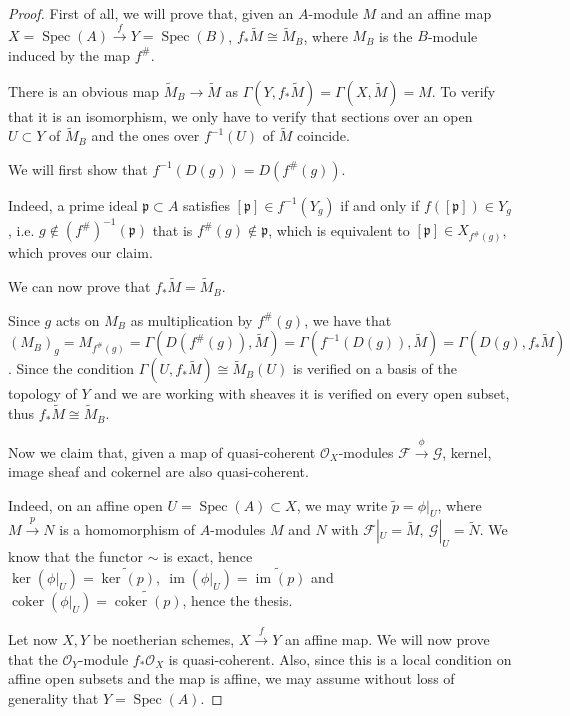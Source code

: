 \documentclass{article}
\newcommand{\pid}{\mathfrak{p}}
\DeclareMathOperator{\im}{im}
\DeclareMathOperator{\coker}{coker}
\DeclareMathOperator{\Spec}{Spec}
\begin{document}
\begin{proof}
    First of all, we will prove that, given an $A$-module $M$ and an affine
    map $X=\Spec(A)\xrightarrow{f}Y=\Spec(B)$, $f_*\tilde{M}\cong
    \tilde{M}_B$, where $M_B$ is the $B$-module induced by the map $f^\#$.

    There is an obvious map $\tilde{M}_B\rightarrow\tilde{M}$ as
    $\Gamma(Y,f_*\tilde{M})=\Gamma(X,\tilde{M})=M$. To verify that
    it is an isomorphism, we only have to verify that sections over an open
    $U\subset Y$ of $\tilde{M}_B$ and the ones over $f^{-1}(U)$ of
    $\tilde{M}$ coincide.

    We will first show that $f^{-1}(D(g))=D(f^\#(g))$.
	
    Indeed, a prime ideal $\pid\subset A$ satisfies $[\pid]\in f^{-1}(Y_g)$
    if and only if $f([\pid])\in Y_g$, i.e. $g\not\in (f^\#)^{-1}(\pid)$
    that is $f^\#(g)\not\in\pid$, which is equivalent to $[\pid]\in
    X_{f^\#(g)}$, which proves our claim.
	
    We can now prove that $f_*\tilde{M}=\tilde{M}_B$.
    
    Since $g$ acts on $M_B$ as multiplication by $f^\#(g)$, we have that
    $(M_B)_g=M_{f^\#(g)}=\Gamma(D(f^\#(g)),\tilde{M})=\Gamma(f^{-1}(D(g)),
    \tilde{M})=\Gamma(D(g),f_*\tilde{M})$. Since the condition
    $\Gamma(U,f_*\tilde{M})\cong\tilde{M}_B(U)$ is verified
    on a basis of the topology of $Y$ and we are working with sheaves it is
    verified on every open subset, thus $f_*\tilde{M}\cong\tilde{M}_B$. 

    Now we claim that, given a map of quasi-coherent
    $\mathcal{O}_X$-modules $\mathcal{F}\xrightarrow{\phi}\mathcal{G}$,
    kernel, image sheaf and cokernel are also quasi-coherent.

    Indeed, on an affine open $U=\Spec(A)\subset X$, we may write
    $\tilde{p}=\phi|_U$, where $M\xrightarrow{p} N$ is a homomorphism of
    $A$-modules $M$ and $N$ with $\mathcal{F}|_U=\tilde{M},\ \mathcal{G}|_U=
    \tilde{N}$. We know that the functor $\sim$ is exact, hence $\ker(\phi|_U)=
    \widetilde{\ker(p)},\ \im(\phi|_U)=\widetilde{\im(p)}$ and
    $\coker(\phi|_U)=\widetilde{\coker(p)}$, hence the thesis.

    Let now $X,Y$ be noetherian schemes, $X\xrightarrow{f} Y$ an affine map.
    We will now prove that the $\mathcal{O}_Y$-module
    $f_*\mathcal{O}_X$ is quasi-coherent. Also, since this is a local
    condition on affine open subsets and the map is affine, we may assume
    without loss of generality that $Y=\Spec(A)$.


\end{proof}
\end{document}
